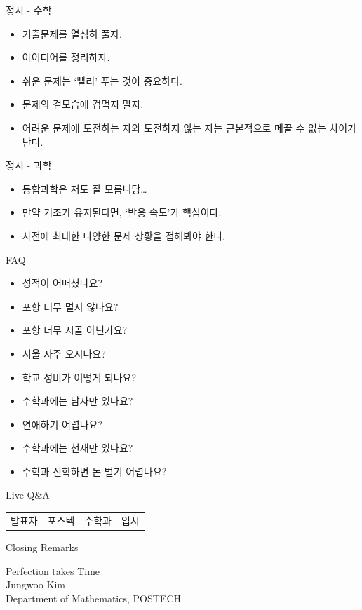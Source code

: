 \documentclass[12pt,aspectratio=169]{beamer}
\newenvironment{mainitemize}{\begin{itemize}\setlength{\itemsep}{0.72em}}{\end{itemize}}
\begin{document}
\begin{frame}{정시 - 수학}
\begin{mainitemize}
  \item 기출문제를 열심히 풀자.
  \item 아이디어를 정리하자.
  \item 쉬운 문제는 ‘빨리’ 푸는 것이 중요하다.
  \item 문제의 겉모습에 겁먹지 말자.
  \item 어려운 문제에 도전하는 자와 도전하지 않는 자는 근본적으로 메꿀 수 없는 차이가 난다.
\end{mainitemize}
\end{frame}

\begin{frame}{정시 - 과학}
\begin{mainitemize}
  \item 통합과학은 저도 잘 모릅니당\ldots
  \item 만약 기조가 유지된다면, ‘반응 속도’가 핵심이다.
  \item 사전에 최대한 다양한 문제 상황을 접해봐야 한다.
\end{mainitemize}
\end{frame}

\begin{frame}{FAQ}
\begin{mainitemize}
  \item 성적이 어떠셨나요?
  \item 포항 너무 멀지 않나요?
  \item 포항 너무 시골 아닌가요?
  \item 서울 자주 오시나요?
  \item 학교 성비가 어떻게 되나요?
  \item 수학과에는 남자만 있나요?
  \item 연애하기 어렵나요?
  \item 수학과에는 천재만 있나요?
  \item 수학과 진학하면 돈 벌기 어렵나요?
\end{mainitemize}
\end{frame}

\begin{frame}{Live Q\&A}
\vfill
\begin{center}
\begin{tabular}{cccc}
{\Large 발표자} & {\Large 포스텍} & {\Large 수학과} & {\Large 입시}
\end{tabular}
\end{center}
\vfill
\end{frame}

\begin{frame}{Closing Remarks}
\vfill
\begin{center}
{\Large Perfection takes Time}\\[1.2em]
Jungwoo Kim\\
Department of Mathematics, POSTECH
\end{center}
\vfill
\end{frame}
\end{document}
